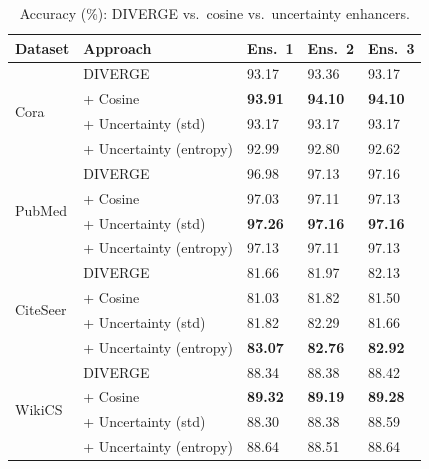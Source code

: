 \begin{table}[htbp]
\centering
\caption{Accuracy (\%): DIVERGE vs.\ cosine vs.\ uncertainty enhancers.}
\label{tab:accuracy_ensemble_after_enhancers}
\small
\begin{tabularx}{\textwidth}{l l *{3}{X}}
\toprule
Dataset & Approach & Ens.\ 1 & Ens.\ 2 & Ens.\ 3 \\
\midrule
\multirow{4}{*}{Cora}
 & DIVERGE & 93.17 & 93.36 & 93.17 \\
 & + Cosine & \textbf{93.91} & \textbf{94.10} & \textbf{94.10} \\
 & + Uncertainty (std) & 93.17 & 93.17 & 93.17 \\
 & + Uncertainty (entropy) & 92.99 & 92.80 & 92.62 \\
\midrule
\multirow{4}{*}{PubMed}
 & DIVERGE & 96.98 & 97.13 & 97.16 \\
 & + Cosine & 97.03 & 97.11 & 97.13 \\
 & + Uncertainty (std) & \textbf{97.26} & \textbf{97.16} & \textbf{97.16} \\
 & + Uncertainty (entropy) & 97.13 & 97.11 & 97.13 \\
\midrule
\multirow{4}{*}{CiteSeer}
 & DIVERGE & 81.66 & 81.97 & 82.13 \\
 & + Cosine & 81.03 & 81.82 & 81.50 \\
 & + Uncertainty (std) & 81.82 & 82.29 & 81.66 \\
 & + Uncertainty (entropy) & \textbf{83.07} & \textbf{82.76} & \textbf{82.92} \\
\midrule
\multirow{4}{*}{WikiCS}
 & DIVERGE & 88.34 & 88.38 & 88.42 \\
 & + Cosine & \textbf{89.32} & \textbf{89.19} & \textbf{89.28} \\
 & + Uncertainty (std) & 88.30 & 88.38 & 88.59 \\
 & + Uncertainty (entropy) & 88.64 & 88.51 & 88.64 \\
\bottomrule
\end{tabularx}
\end{table}

